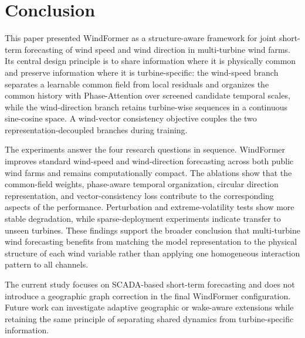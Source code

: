 \documentclass[preprint,review,12pt]{elsarticle}
\begin{document}




\section{Conclusion}
\label{sec:conclusion}
This paper presented WindFormer as a structure-aware framework for joint short-term forecasting of wind speed and wind direction in multi-turbine wind farms. Its central design principle is to share information where it is physically common and preserve information where it is turbine-specific: the wind-speed branch separates a learnable common field from local residuals and organizes the common history with Phase-Attention over screened candidate temporal scales, while the wind-direction branch retains turbine-wise sequences in a continuous sine-cosine space. A wind-vector consistency objective couples the two representation-decoupled branches during training.

The experiments answer the four research questions in sequence. WindFormer improves standard wind-speed and wind-direction forecasting across both public wind farms and remains computationally compact. The ablations show that the common-field weights, phase-aware temporal organization, circular direction representation, and vector-consistency loss contribute to the corresponding aspects of the performance. Perturbation and extreme-volatility tests show more stable degradation, while sparse-deployment experiments indicate transfer to unseen turbines. These findings support the broader conclusion that multi-turbine wind forecasting benefits from matching the model representation to the physical structure of each wind variable rather than applying one homogeneous interaction pattern to all channels.

The current study focuses on SCADA-based short-term forecasting and does not introduce a geographic graph correction in the final WindFormer configuration. Future work can investigate adaptive geographic or wake-aware extensions while retaining the same principle of separating shared dynamics from turbine-specific information.



\end{document}
